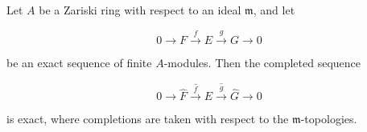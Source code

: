 Let $A$ be a Zariski ring with respect to an ideal $\mathfrak{m}$, and let

$$0 \to F \xrightarrow{f} E \xrightarrow{g} G \to 0$$

be an exact sequence of finite $A$-modules. Then the completed sequence

$$0 \to \hat{F} \xrightarrow{\hat{f}} \hat{E} \xrightarrow{\hat{g}} \hat{G} \to 0$$

is exact, where completions are taken with respect to the $\mathfrak{m}$-topologies.